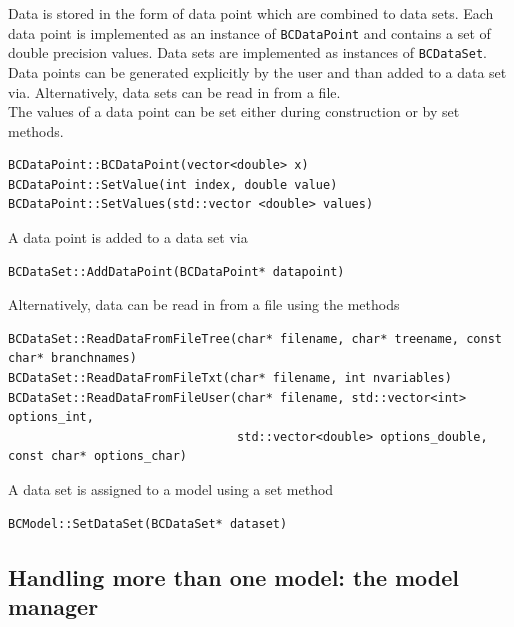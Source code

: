 \documentclass[11pt, a4paper]{article}
\begin{document}
Data is stored in the form of data point which are combined to data
sets. Each data point is implemented as an instance of
\verb|BCDataPoint| and contains a set of double precision values. Data
sets are implemented as instances of \verb|BCDataSet|. Data points can
be generated explicitly by the user and than added to a data set
via. Alternatively, data sets can be read in from a file. \\ 

\noindent 
The values of a data point can be set either during construction or by
set methods. 
\begin{small}
\begin{verbatim}
BCDataPoint::BCDataPoint(vector<double> x) 
BCDataPoint::SetValue(int index, double value)  
BCDataPoint::SetValues(std::vector <double> values) 
\end{verbatim} 
\end{small} 

\noindent 
A data point is added to a data set via  
\begin{small}
\begin{verbatim}
BCDataSet::AddDataPoint(BCDataPoint* datapoint)
\end{verbatim} 
\end{small} 

\noindent 
Alternatively, data can be read in from a file using the methods 
\begin{small}
\begin{verbatim}
BCDataSet::ReadDataFromFileTree(char* filename, char* treename, const char* branchnames)
BCDataSet::ReadDataFromFileTxt(char* filename, int nvariables)
BCDataSet::ReadDataFromFileUser(char* filename, std::vector<int> options_int,
                                std::vector<double> options_double, const char* options_char)
\end{verbatim} 
\end{small} 

\noindent 
A data set is assigned to a model using a set method 
\begin{small} 
\begin{verbatim}
BCModel::SetDataSet(BCDataSet* dataset)
\end{verbatim} 
\end{small} 


\subsection{Handling more than one model: the model manager} 
\end{document}
